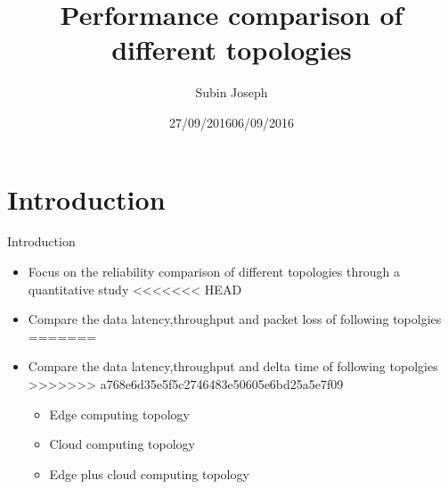 \documentclass{beamer}
\title[Your Short Title]{Performance comparison of different topologies}
\author{Subin Joseph}
\institute{TU Kaiserslautern}
\date{27/09/2016}
\date{06/09/2016}
\begin{document}
\begin{frame}
  \titlepage

\end{frame}


\section{Introduction}

\begin{frame}{Introduction}



\begin{itemize}
  \item Focus on the reliability comparison of different topologies through a quantitative study
<<<<<<< HEAD
  \item Compare the data latency,throughput and packet loss of following topolgies
=======
  \item Compare the data latency,throughput and delta time of following topolgies
>>>>>>> a768e6d35e5f5c2746483e50605e6bd25a5e7f09
  \begin{itemize}
  	\item Edge computing topology
  	\item Cloud computing topology
  	\item Edge plus cloud computing topology
  \end{itemize}

\end{itemize}


\end{frame}
\end{document}
